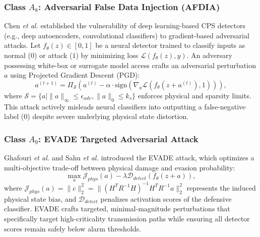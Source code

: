 \documentclass[journal,compsoc]{IEEEtran}
\begin{document}
\subsubsection{Class $A_8$: Adversarial False Data Injection (AFDIA) \cite{ref35, ref80}}
Chen \textit{et al.} \cite{ref35} established the vulnerability of deep learning-based CPS detectors (e.g., deep autoencoders, convolutional classifiers) to gradient-based adversarial attacks. Let $f_\theta(z) \in [0, 1]$ be a neural detector trained to classify inputs as normal ($0$) or attack ($1$) by minimizing loss $\mathcal{L}(f_\theta(z), y)$. An adversary possessing white-box or surrogate model access crafts an adversarial perturbation $a$ using Projected Gradient Descent (PGD):
\begin{equation}
    a^{(t+1)} = \Pi_{\mathcal{S}} \left( a^{(t)} - \alpha \cdot \text{sign}\left( \nabla_a \mathcal{L}(f_\theta(z + a^{(t)}), 1) \right) \right),
\end{equation}
where $\mathcal{S} = \{a \mid \|a\|_\infty \le \epsilon_{adv}, \|a\|_0 \le k_s\}$ enforces physical and sparsity limits. This attack actively misleads neural classifiers into outputting a false-negative label ($0$) despite severe underlying physical state distortion.

\subsubsection{Class $A_9$: EVADE Targeted Adversarial Attack \cite{ref15, ref75, ref43}}
Ghafouri \textit{et al.} \cite{ref15} and Sahu \textit{et al.} \cite{ref75} introduced the EVADE attack, which optimizes a multi-objective trade-off between physical damage and evasion probability:
\begin{equation}
    \max_{a} \mathcal{J}_{phys}(a) - \lambda \mathcal{D}_{detect}(f_\theta(z + a)),
\end{equation}
where $\mathcal{J}_{phys}(a) = \|c\|_2^2 = \|(H^T R^{-1} H)^{-1} H^T R^{-1} a\|_2^2$ represents the induced physical state bias, and $\mathcal{D}_{detect}$ penalizes activation scores of the defensive classifier. EVADE crafts targeted, minimal-magnitude perturbations that specifically target high-criticality transmission paths while ensuring all detector scores remain safely below alarm thresholds.
\end{document}
